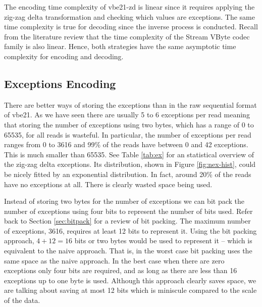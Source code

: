 The encoding time complexity of vbe21-zd is linear since it requires
applying the zig-zag delta transformation and checking which values are
exceptions. The same time complexity is true for decoding since the inverse
process is conducted. Recall from
the literature review
that the time complexity of the Stream VByte codec family is also linear. Hence,
both strategies have the same asymptotic time complexity for encoding and
decoding.

%

\subsection{Exceptions Encoding}

There are better ways of storing the exceptions than in the raw sequential
format of vbe21.
As we have seen there are usually 5 to 6 exceptions per read meaning that
storing the number of exceptions using two bytes, which has a range of 0 to 65535,
for all reads is wasteful.
In particular, the number of exceptions per read ranges from 0 to 3616 and 99\%
of the reads have between 0 and 42 exceptions. This is much smaller than 65535.
See Table \ref{tab:ex} for an statistical overview of the zig-zag delta
exceptions. Its distribution, shown in Figure \ref{fig:nex-hist}, could be
nicely fitted by an exponential distribution. In fact, around 20\% of the reads
have no exceptions at all. There is clearly wasted space being used.




Instead of storing two bytes for the number of exceptions we can bit pack the
number of exceptions using four bits to represent the number of bits used.
Refer back to Section \ref{sec:bitpack} for a review of bit packing.
The maximum number of exceptions, 3616, requires at least
12 bits to represent it. Using the bit packing approach, $4+12=16$ bits or two
bytes would be used to represent it -- which is equivalent to the naive
approach. That is, in the worst case bit packing uses the same space as the naive
approach. In the best case when there are zero exceptions only four bits are
required, and as long as there are less than 16 exceptions up to one byte is
used. Although this approach clearly saves space, we are talking about saving at
most 12 bits which is miniscule compared to the scale of the data.

